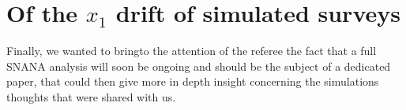 \documentclass[11pt,a4paper]{paper}
\begin{document}
\section{Of the $x_1$ drift of simulated surveys}
Finally, we wanted to bringto the attention of the referee the fact that a full
SNANA analysis will soon be ongoing and should be the subject of a dedicated
paper, that could then give more in depth insight concerning the simulations
thoughts that were shared with us.
\end{document}
